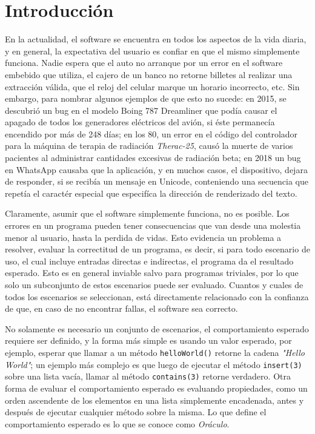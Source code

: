 \chapter{Introducci\'on}
\label{cap:introduccion}
En la actualidad, el software se encuentra en todos los aspectos de la vida diaria, y en general, la expectativa del usuario es confiar en que el mismo simplemente funciona. Nadie espera que el auto no arranque por un error en el software embebido que utiliza, el cajero de un banco no retorne billetes al realizar una extracci\'on v\'alida, que el reloj del celular marque un horario incorrecto, etc. Sin embargo, para nombrar algunos ejemplos de que esto no sucede: en 2015, se descubri\'o un bug en el modelo Boing 787 Dreamliner que pod\'ia causar el apagado de todos los generadores el\'ectricos del avi\'on, si \'este permanec\'ia encendido por m\'as de 248 d\'ias; en los 80, un error en el c\'odigo del controlador para la m\'aquina de terapia de radiaci\'on \emph{Therac-25}, caus\'o la muerte de varios pacientes al administrar cantidades excesivas de radiaci\'on beta; en 2018 un bug en WhatsApp causaba que la aplicaci\'on, y en muchos casos, el dispositivo, dejara de responder, si se recib\'ia un mensaje en Unicode, conteniendo una secuencia que repet\'ia el caract\'er especial que especif\'ica la direcci\'on de renderizado del texto.

Claramente, asumir que el software simplemente funciona, no es posible. Los errores en un programa pueden tener consecuencias que van desde una molestia menor al usuario, hasta la perdida de vidas. Esto evidencia un problema a resolver, evaluar la correctitud de un programa, es decir, si para todo escenario de uso, el cual incluye entradas directas e indirectas, el programa da el resultado esperado. Esto es en general inviable salvo para programas triviales, por lo que solo un subconjunto de estos escenarios puede ser evaluado. Cuantos y cuales de todos los escenarios se seleccionan, est\'a directamente relacionado con la confianza de que, en caso de no encontrar fallas, el software sea correcto.

No solamente es necesario un conjunto de escenarios, el comportamiento esperado requiere ser definido, y la forma m\'as simple es usando un valor esperado, por ejemplo, esperar que llamar a un m\'etodo \texttt{helloWorld()} retorne la cadena \emph{"Hello World"}; un ejemplo m\'as complejo es que luego de ejecutar el m\'etodo \texttt{insert(3)} sobre una lista vac\'ia, llamar al m\'etodo \texttt{contains(3)} retorne verdadero. Otra forma de evaluar el comportamiento esperado es evaluando propiedades, como un orden ascendente de los elementos en una lista simplemente encadenada, antes y despu\'es de ejecutar cualquier m\'etodo sobre la misma. Lo que define el comportamiento esperado es lo que se conoce como \emph{Or\'aculo}.

